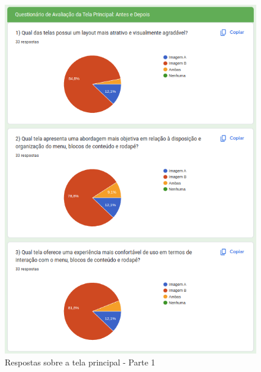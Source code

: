 \begin{figure}[!h]
	\begin{center}
	    \includegraphics[scale=0.7]{figs/Answers/Students/12.png}
	\end{center}
	\caption{\label{APB_TP01}Respostas sobre a tela principal - Parte 1}
\end{figure}

\newpage

